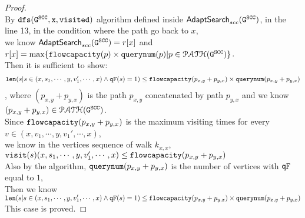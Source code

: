 \begin{proof}
$$  $$
  By $\mathtt{dfs(\mathtt{G^{SCC}}, x, visited)}$ algorithm defined inside $\mathsf{AdaptSearch}_{scc}(\mathtt{G^{SCC}})$, 
  in the line 13, in the condition where the path go back to $x$,
  \\
  we know $\mathsf{AdaptSearch}_{scc}(\mathtt{G^{SCC}}) = r[x]$ and
  $r[x] = \max\{\mathtt{flowcapacity}(p) \times \mathtt{querynum}(p) | p \in \mathcal{PATH}(\mathtt{G^{SCC}})\}$.
  \\
  Then it is sufficient to show: 
  $$ 
  \mathtt{len}(s | s \in (x, s_1, \cdots, y, v_1', \cdots, x) \land \mathtt{qF}(s) = 1) \leq \mathtt{flowcapacity}(p_{x, y} + p_{y, x}) \times \mathtt{querynum}(p_{x, y} + p_{y, x}) 
  $$
  , where $(p_{x, y} + p_{y, x})$ is the path $p_{x, y}$ concatenated by path $p_{y, x}$ and we know $(p_{x, y} + p_{y, x}) \in \mathcal{PATH}(\mathtt{G^{SCC}})$.
  \\
Since $\mathtt{flowcapacity}(p_{x, y} + p_{y, x})$ is the maximum visiting times for every $v \in (x, v_1, \cdots, y, v_1', \cdots, x)$, 
\\
we know in the vertices sequence of walk $k_{x,x}$, 
$\mathtt{visit}(s) (x, s_1, \cdots, y, v_1', \cdots, x)  \leq \mathtt{flowcapacity}(p_{x, y} + p_{y, x})$
  \\
  Also by the algorithm, $\mathtt{querynum}(p_{x, y} + p_{y, x})$ is the number of vertices with $\mathtt{qF}$ equal to $1$,
  \\
  Then we know 
  \\
  $\mathtt{len}(s | s \in (x, s_1, \cdots, y, v_1', \cdots, x) \land \mathtt{qF}(s) = 1) \leq \mathtt{flowcapacity}(p_{x, y} + p_{y, x}) \times \mathtt{querynum}(p_{x, y} + p_{y, x}) $
  \\
  This case is proved.
%
%
\end{proof}
